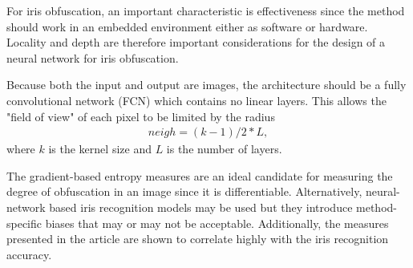 For iris obfuscation, an important characteristic is effectiveness since the method should work in an embedded environment either as software or hardware. Locality and depth are therefore important considerations for the design of a neural network for iris obfuscation.

Because both the input and output are images, the architecture should be a fully convolutional network (FCN) which contains no linear layers. This allows the "field of view" of each pixel to be limited by the radius
\begin{align}
    neigh = (k-1)/2*L,
\end{align}
where $k$ is the kernel size and $L$ is the number of layers. 

The gradient-based entropy measures are an ideal candidate for measuring the degree of obfuscation in an image since it is differentiable. Alternatively, neural-network based iris recognition models may be used \parencite{nguyen2017iris, gangwar2016deepirisnet} but they introduce method-specific biases that may or may not be acceptable. Additionally, the measures presented in the article are shown to correlate highly with the iris recognition accuracy.

